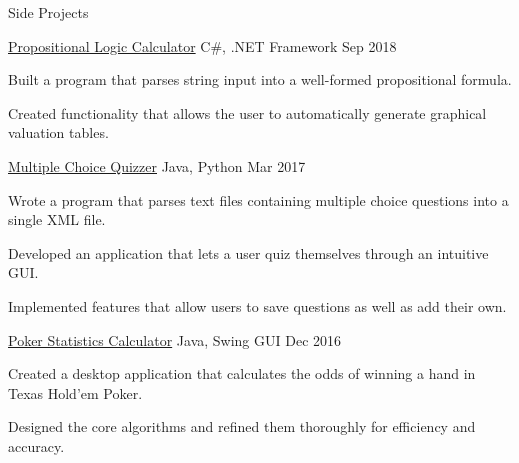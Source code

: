 \documentclass{resume} %
\begin{document}

\begin{rSection}{Side Projects}
    
    \begin{sideproject}
        {\href{https://github.com/wbhildeb/Propositional-Logic}{\faGithub{} Propositional Logic Calculator}}
        {C\#, .NET Framework}
        {Sep 2018}
        {
            \item Built a program that parses string input into a well-formed propositional formula.
            \item Created functionality that allows the user to automatically generate graphical valuation tables.
        }
    \end{sideproject}

    \begin{sideproject}
        {\href{https://github.com/wbhildeb/Multi-Choice-Quiz-App/blob/master/Quizzer/src/MainGUI.java}{\faGithub{} Multiple Choice Quizzer}}
        {Java, Python}
        {Mar 2017}
        {
            \item Wrote a program that parses text files containing multiple choice questions into a single XML file.
            \item Developed an application that lets a user quiz themselves through an intuitive GUI.
            \item Implemented features that allow users to save questions as well as add their own.
        }
    \end{sideproject}

    \begin{sideproject}
        {\href{https://github.com/wbhildeb/Texas-Hold-em-Calculator}{\faGithub{} Poker Statistics Calculator}}
        {Java, Swing GUI}
        {Dec 2016}
        {
            \item Created a desktop application that calculates the odds of winning a hand in Texas Hold'em Poker.
            \item Designed the core algorithms and refined them thoroughly for efficiency and accuracy.
        }
    \end{sideproject}

\end{rSection}

\end{document}
